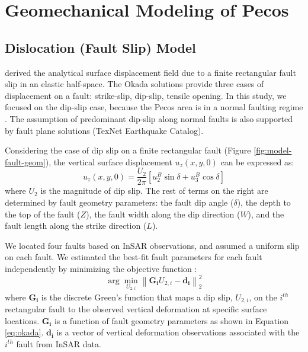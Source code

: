 
\chapter{Geomechanical Modeling of Pecos}


\section{Dislocation (Fault Slip) Model}
\label{appen:okada}
\cite{Okada1992InternalDeformationDue} derived the analytical surface displacement field due to a finite rectangular fault slip in an elastic half-space. The Okada solutions provide three cases of displacement on a fault: strike-slip, dip-slip, tensile opening. In this study, we focused on the dip-slip case, because the Pecos area is in a normal faulting regime \cite{LundSnee2018}.  The assumption of predominant dip-slip along normal faults is also supported by fault plane solutions (TexNet Earthquake Catalog). 

Considering the case of dip slip on a finite rectangular fault (Figure \ref{fig:model-fault-geom}), the vertical surface displacement $u_z(x, y, 0)$ can be expressed as:
\begin{equation}
	u_{z}(x,y,0)=\frac{U_{2}}{2\pi }[u_{2}^{B}\sin \delta + u_{3}^{B}\cos \delta]
	\label{eq:okada}
\end{equation}
where $U_2$ is the magnitude of dip slip. The rest of terms on the right are determined by fault geometry parameters: the fault dip angle ($\delta$), the depth to the top of the fault ($Z$), the fault width along the dip direction ($W$), and the fault length along the strike direction ($L$). 

We located four faults based on InSAR observations, and assumed a uniform slip on each fault. We estimated the best-fit fault parameters for each fault independently by minimizing the objective function \cite{Du1992}:
\begin{equation}
	\arg \min_{U_{2,i}} \left \| \mathbf{G_i}U_{2,i}-\mathbf{d_i} \right \|^2_{2}  
	\label{eq:model-obj-1}
\end{equation}	  	
where $\mathbf{G_i}$ is the discrete Green’s function that maps a dip slip, $U_{2,i}$, on the $i^{th}$ rectangular fault to the observed vertical deformation at specific surface locations.  $\mathbf{G_i}$ is a function of fault geometry parameters as shown in Equation \eqref{eq:okada}. $\mathbf{d_i}$ is a vector of vertical deformation observations associated with the $i^{th}$ fault from InSAR data.

